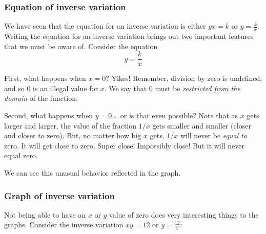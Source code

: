 \subsubsection{Equation of inverse variation}

We have seen that the equation for an inverse variation is either $yx = k$ or $y=\frac{k}{x}$. Writing the equation for an inverse variation brings out two important features that we must be aware of. Consider the equation \[y = \frac{k}{x}\]

First, what happens when $x=0$? Yikes! Remember, division by zero is undefined, and so 0 is an illegal value for $x$. We say that 0 must be \textit{restricted from the domain} of the function.

Second, what happens when $y=0$\ldots\ or is that even possible? Note that as $x$ gets larger and larger, the value of the fraction $1/x$ gets smaller and smaller (closer and closer to zero). But, no matter how big $x$ gets, $1/x$ will never be \textit{equal to} zero. It will get close to zero. Super close! Impossibly close! But it will never equal zero.

We can see this unusual behavior reflected in the graph.


\subsubsection{Graph of inverse variation}

Not being able to have an $x$ or $y$ value of zero does very interesting things to the graphs. Consider the inverse variation $xy=12$ or $y = \frac{12}{x}$:

\begin{center}
\end{center}


